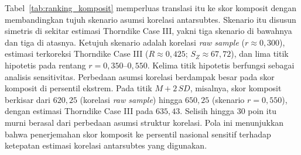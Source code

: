 

Tabel~\ref{tab:ranking_komposit} memperluas translasi itu ke skor komposit dengan membandingkan tujuh skenario asumsi korelasi antarsubtes. Skenario itu disusun simetris di sekitar estimasi Thorndike Case III, yakni tiga skenario di bawahnya dan tiga di atasnya. Ketujuh skenario adalah korelasi \textit{raw sample} ($r \approx 0,300$), estimasi terkoreksi Thorndike Case III ($R \approx 0,425$; $S_Z \approx 67,72$), dan lima titik hipotetis pada rentang $r = 0,350$--$0,550$. Kelima titik hipotetis berfungsi sebagai analisis sensitivitas. Perbedaan asumsi korelasi berdampak besar pada skor komposit di persentil ekstrem. Pada titik $M + 2\,SD$, misalnya, skor komposit berkisar dari $620,25$ (korelasi \textit{raw sample}) hingga $650,25$ (skenario $r = 0,550$), dengan estimasi Thorndike Case III pada $635,43$. Selisih hingga 30 poin itu murni berasal dari perbedaan asumsi struktur korelasi. Pola ini menunjukkan bahwa penerjemahan skor komposit ke persentil nasional sensitif terhadap ketepatan estimasi korelasi antarsubtes yang digunakan.

